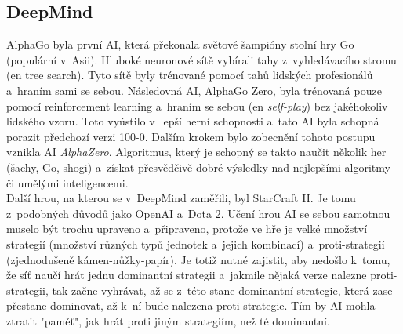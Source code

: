 \documentclass[12pt,oneside]{report}			%
\begin{document}
	\subsection{DeepMind}
	\label{sec:DeepMind}
	AlphaGo byla první \gls{AI}, která překonala světové šampióny stolní hry Go (populární v~Asii). Hluboké neuronové sítě vybírali tahy z~vyhledávacího stromu (\gls{en} tree search). Tyto sítě byly trénované pomocí tahů lidských profesionálů a~hraním sami se sebou. Následovná \gls{AI}, AlphaGo Zero, byla trénovaná pouze pomocí reinforcement learning a~hraním se sebou (\gls{en} \emph{self-play}) bez jakéhokoliv lidského vzoru. Toto vyústilo v~lepší herní schopnosti a~tato \gls{AI} byla schopná porazit předchozí verzi 100-0. \parencite{AlphaGoZero} Dalším krokem bylo zobecnění tohoto postupu vznikla \gls{AI} \emph{AlphaZero}. Algoritmus, který je schopný se takto naučit několik her (šachy, Go, shogi) a~získat přesvědčivě dobré výsledky nad nejlepšími algoritmy či umělými inteligencemi.\parencite{AlphaZero}\\
	Další hrou, na kterou se v~DeepMind zaměřili, byl StarCraft II. Je tomu z~podobných důvodů jako OpenAI a~Dota 2. Učení hrou \gls{AI} se sebou samotnou muselo být trochu upraveno a~připraveno, protože ve hře je velké množství strategií (množství různých typů jednotek a~jejich kombinací) a~proti-strategií (zjednodušeně kámen-nůžky-papír). Je totiž nutné zajistit, aby nedošlo k~tomu, že síť naučí hrát jednu dominantní strategii a~jakmile nějaká verze nalezne proti-strategii, tak začne vyhrávat, až se z~této stane dominantní strategie, která zase přestane dominovat, až k~ní bude nalezena proti-strategie. Tím by \gls{AI} mohla ztratit "paměť", jak hrát proti jiným strategiím, než té dominantní.\parencite{AlphaStar}
\end{document}
